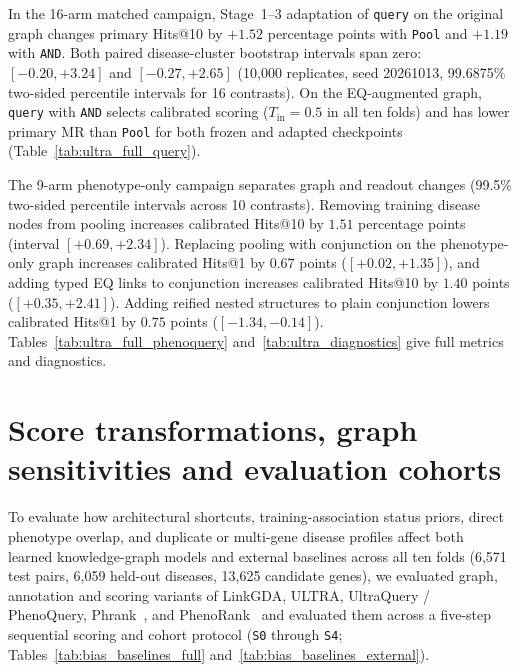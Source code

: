 \documentclass{article}
\newcommand{\method}{LinkGDA}
\begin{document}
In the 16-arm matched campaign, Stage~1--3 adaptation of \texttt{query}
on the original graph changes primary Hits@10 by $+1.52$ percentage points
with \texttt{Pool} and $+1.19$ with \texttt{AND}. Both paired disease-cluster
bootstrap intervals span zero: $[-0.20, +3.24]$ and $[-0.27, +2.65]$
(10{,}000 replicates, seed 20261013, 99.6875\% two-sided percentile intervals
for 16 contrasts). On the EQ-augmented graph, \texttt{query} with \texttt{AND}
selects calibrated scoring ($T_{\mathrm{in}}=0.5$ in all ten folds) and has
lower primary MR than \texttt{Pool} for both frozen and adapted checkpoints
(Table~\ref{tab:ultra_full_query}).

The 9-arm phenotype-only campaign separates graph and readout changes
(99.5\% two-sided percentile intervals across 10 contrasts). Removing training
disease nodes from pooling increases calibrated Hits@10 by $1.51$ percentage
points (interval $[+0.69, +2.34]$). Replacing pooling with conjunction on the
phenotype-only graph increases calibrated Hits@1 by $0.67$ points
($[+0.02, +1.35]$), and adding typed EQ links to conjunction increases
calibrated Hits@10 by $1.40$ points ($[+0.35, +2.41]$). Adding reified nested
structures to plain conjunction lowers calibrated Hits@1 by $0.75$ points
($[-1.34, -0.14]$). Tables~\ref{tab:ultra_full_phenoquery}
and~\ref{tab:ultra_diagnostics} give full metrics and diagnostics.







\section{Score transformations, graph sensitivities and evaluation cohorts}

To evaluate how architectural shortcuts, training-association status priors,
direct phenotype overlap, and duplicate or multi-gene disease profiles affect
both learned knowledge-graph models and external baselines across all ten folds
(6{,}571 test pairs, 6{,}059 held-out diseases, 13{,}625 candidate genes), we
evaluated graph, annotation and scoring variants of \method{}, ULTRA, UltraQuery /
PhenoQuery, Phrank~\cite{jagadeesh2019phrank}, and
PhenoRank~\cite{cornish2018phenorank} and evaluated them across a five-step
sequential scoring and cohort protocol (\texttt{S0} through \texttt{S4};
Tables~\ref{tab:bias_baselines_full} and~\ref{tab:bias_baselines_external}).
\end{document}
